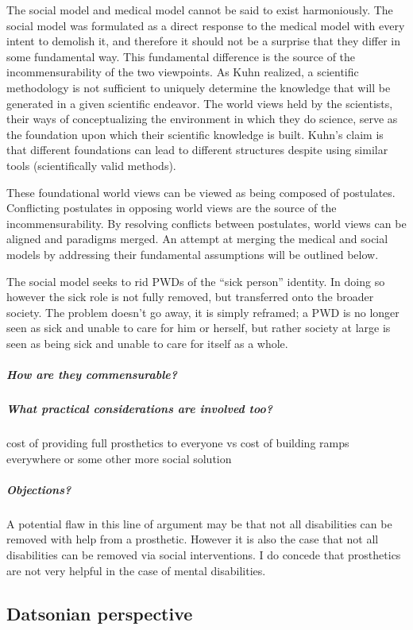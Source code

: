 \documentclass[a4paper]{article}
\begin{document}
The social model and medical model cannot be said to exist harmoniously. The
social model was formulated as a direct response to the medical model with
every intent to demolish it, and therefore it should not be a surprise that
they differ in some fundamental way. This fundamental difference is the source
of the incommensurability of the two viewpoints. As Kuhn realized, a
scientific methodology is not sufficient to uniquely determine the knowledge
that will be generated in a given scientific endeavor. The world views held by
the scientists, their ways of conceptualizing the environment in which they do
science, serve as the foundation upon which their scientific knowledge is
built. Kuhn's claim is that different foundations can lead to different
structures despite using similar tools (scientifically valid methods).

These foundational world views can be viewed as being composed of postulates.
Conflicting postulates in opposing world views are the source of the
incommensurability. By resolving conflicts between postulates, world views can
be aligned and paradigms merged. An attempt at merging the medical and social
models by addressing their fundamental assumptions will be outlined below.

The social model seeks to rid PWDs of the ``sick person'' identity. In doing
so however the sick role is not fully removed, but transferred onto the
broader society. The problem doesn’t go away, it is simply reframed; a PWD is
no longer seen as sick and unable to care for him or herself, but rather
society at large is seen as being sick and unable to care for itself as a
whole.

\subparagraph{How are they commensurable?}

\subparagraph{What practical considerations are involved too?}

cost of providing full prosthetics to everyone vs cost of building ramps
everywhere or some other more social solution

\subparagraph{Objections?}

A potential flaw in this line of argument may be that not all disabilities can
be removed with help from a prosthetic. However it is also the case that not
all disabilities can be removed via social interventions. I do concede that
prosthetics are not very helpful in the case of mental disabilities. 


\subsection{Datsonian perspective}
\end{document}
